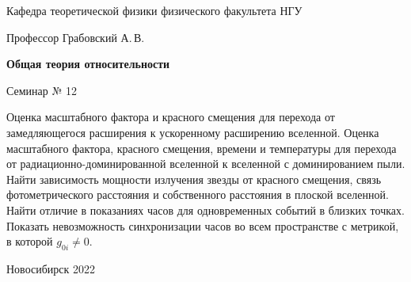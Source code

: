 \documentclass[12pt,pagesize,paper=192mm:108mm,landscape]{scrbook}
\begin{document}
\begin{titlepage}
\begin{center}
    Кафедра теоретической физики физического факультета НГУ

    \Large
    Профессор Грабовский А.\,В.

    \huge
    \textbf{Общая теория относительности}

    \Large
    Семинар № 12
    \vfill

    \normalsize
    \begin{minipage}{0.83\linewidth}
      Оценка масштабного фактора и красного смещения для перехода от
      замедляющегося расширения к ускоренному расширению вселенной.
      Оценка масштабного фактора, красного смещения, времени и
      температуры для перехода от радиационно-доминированной вселенной
      к вселенной с доминированием пыли. Найти зависимость мощности
      излучения звезды от красного смещения, связь фотометрического
      расстояния и собственного расстояния в плоской вселенной. Найти
      отличие в показаниях часов для одновременных событий в близких
      точках. Показать невозможность синхронизации часов во всем
      пространстве с метрикой, в которой $g_{0i}\ne0$.
    \end{minipage}
    \vfill

    \normalsize \ccbysa\hspace{0.5em}  Новосибирск 2022
  \end{center}
\end{titlepage}
\end{document}
